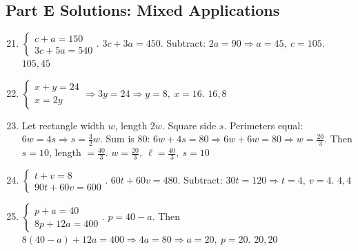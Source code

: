 \documentclass[14pt]{extarticle}
\begin{document}
\subsection*{Part E Solutions: Mixed Applications}
\begin{enumerate}
  \setcounter{enumi}{20}
  \item \(\begin{cases} c+a=150 \\ 3c+5a=540 \end{cases}\).  
  \(3c+3a=450\). Subtract: \(2a=90 \Rightarrow a=45,\ c=105\). \(\boxed{105,45}\)

  \item \(\begin{cases} x+y=24 \\ x=2y \end{cases}\Rightarrow 3y=24 \Rightarrow y=8,\ x=16\). \(\boxed{16,8}\)

  \item Let rectangle width \(w\), length \(2w\). Square side \(s\).  
  Perimeters equal: \(6w=4s \Rightarrow s=\tfrac{3}{2}w\). Sum is 80: \(6w+4s=80 \Rightarrow 6w+6w=80 \Rightarrow w=\tfrac{20}{3}\).  
  Then \(s=10\), length \(=\tfrac{40}{3}\). \(\boxed{w=\tfrac{20}{3},\ \ell=\tfrac{40}{3},\ s=10}\)

  \item \(\begin{cases} t+v=8 \\ 90t+60v=600 \end{cases}\).  
  \(60t+60v=480\). Subtract: \(30t=120 \Rightarrow t=4,\ v=4\). \(\boxed{4,4}\)

  \item \(\begin{cases} p+a=40 \\ 8p+12a=400 \end{cases}\).  
  \(p=40-a\). Then \(8(40-a)+12a=400 \Rightarrow 4a=80 \Rightarrow a=20,\ p=20\). \(\boxed{20,20}\)
\end{enumerate}




\end{document}
